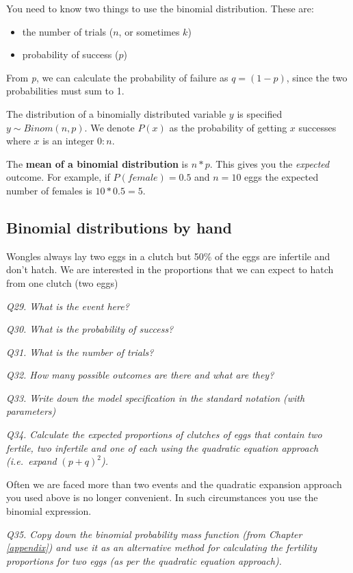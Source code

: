 \documentclass[
  11pt,
  a4paper,
]{book}
\providecommand{\tightlist}{%
  \setlength{\itemsep}{0pt}\setlength{\parskip}{0pt}}
\begin{document}
You need to know two things to use the binomial distribution. These are:

\begin{itemize}
\tightlist
\item
  the number of trials (\(n\), or sometimes \(k\))
\item
  probability of success (\(p\))
\end{itemize}

From \emph{p}, we can calculate the probability of failure as \(q = (1-p)\), since the two probabilities must sum to 1.

The distribution of a binomially distributed variable \(y\) is specified \(y \sim Binom(n,p)\). We denote \(P(x)\) as the probability of getting \(x\) successes where \(x\) is an integer \(0:n\).

The \textbf{mean of a binomial distribution} is \(n*p\). This gives you the \emph{expected} outcome. For example, if \(P(female)=0.5\) and \(n=10\) eggs the expected number of females is \(10*0.5=5\).

\hypertarget{binomial-distributions-by-hand}{%
\subsection{Binomial distributions by hand}\label{binomial-distributions-by-hand}}

Wongles always lay two eggs in a clutch but 50\% of the eggs are infertile and don't hatch. We are interested in the proportions that we can expect to hatch from one clutch (two eggs)

\emph{Q29. What is the event here?}

\emph{Q30. What is the probability of success?}

\emph{Q31. What is the number of trials?}

\emph{Q32. How many possible outcomes are there and what are they?}

\emph{Q33. Write down the model specification in the standard notation (with parameters)}

\emph{Q34. Calculate the expected proportions of clutches of eggs that contain two fertile, two infertile and one of each using the quadratic equation approach (i.e.~expand} \((p+q)^2\)\emph{).}

Often we are faced more than two events and the quadratic expansion approach you used above is no longer convenient. In such circumstances you use the binomial expression.

\emph{Q35. Copy down the binomial probability mass function (from Chapter \ref{appendix}) and use it as an alternative method for calculating the fertility proportions for two eggs (as per the quadratic equation approach).}
\end{document}
